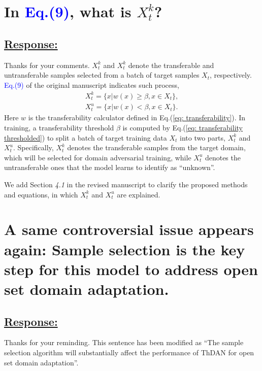 \section{In \textcolor{blue}{Eq.(9)}, what is  $X_t^k$?}
\subsection*{\underline{\textbf{Response:}}}

Thanks for your comments.
$X_t^k$ and $X_t^k$ denote the transferable and untransferable samples selected from a batch of target samples $X_t$, respectively.
\textcolor{blue}{Eq.(9)} of the original manuscript indicates such process,
\begin{equation}
    \label{eq: split target examples}
    \begin{split}
        X_t^k=\{x|w(x) \geq \beta, x \in X_t \}, \\
        X_t^u=\{x|w(x) < \beta, x \in X_t \}.
    \end{split}
\end{equation}
Here $w$ is the transferability calculator defined in Eq.(\ref{eq: transferability}).
In training, a transferability threshold $\beta$ is computed by Eq.(\ref{eq: transferability thresholded}) to split a batch of target training data $X_t$ into two parts, $X_t^k$ and $X_t^u$.
Specifically, $X_t^k$ denotes the transferable samples from the target domain, which will be selected for domain adversarial training, while $X_t^u$ denotes the untransferable ones that the model learns to identify as ``unknown''.

We add Section \textit{4.1} in the revised manuscript to clarify the proposed methods and equations, in which $X_t^k$ and $X_t^u$ are explained.

\section{A same controversial issue appears again: Sample selection is the key step for this model to address open set domain adaptation.}
\subsection*{\underline{\textbf{Response:}}}

Thanks for your reminding.
This sentence has been modified as ``The sample selection algorithm will substantially affect the performance of ThDAN for open set domain adaptation''.

